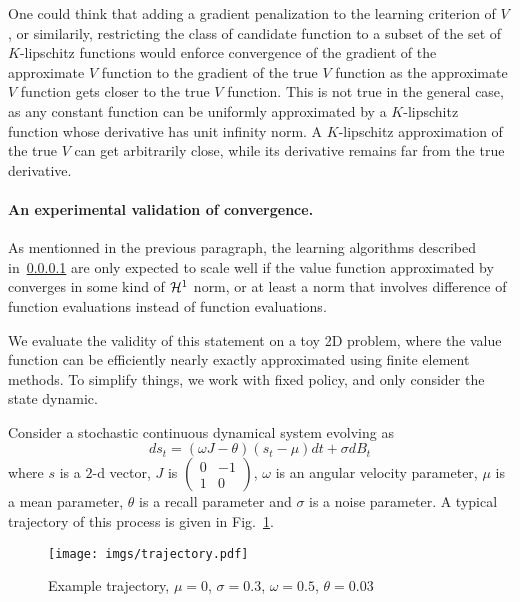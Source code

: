 One could think that adding a gradient penalization to the learning criterion of
$V$, or similarily, restricting the class of candidate function to a subset of 
the set of $K$-lipschitz functions would enforce convergence of the gradient of the
approximate $V$ function to the gradient of the true $V$ function as the approximate
$V$ function gets closer to the true $V$ function. This is not true
in the general case, as any constant function can be uniformly approximated by a
$K$-lipschitz function whose derivative has unit infinity norm. A $K$-lipschitz
approximation of the true $V$ can get arbitrarily close, while its derivative remains
far from the true derivative.

\paragraph{An experimental validation of \tdz convergence.}
As mentionned in the previous paragraph, the learning algorithms described
in~\ref{} are only expected to scale well if the value function approximated by
\tdz converges in some kind of $\mathcal{H}^1$ norm, or at least a norm that involves
difference of function evaluations instead of function evaluations.

We evaluate the validity of this statement on a toy 2D problem, where the
value function can be efficiently nearly exactly approximated using finite
element methods. To simplify things, we work with fixed policy, and only
consider the state dynamic.

Consider a stochastic continuous dynamical system evolving as
\begin{equation}
	ds_t = (\omega J -\theta) (s_t - \mu) dt + \sigma dB_t
\end{equation}
where $s$ is a $2$-d vector, $J$ is $\begin{pmatrix} 0 & -1 \\ 1 & 0\end{pmatrix}$,
$\omega$ is an angular velocity parameter, $\mu$ is a mean parameter, $\theta$ is a
recall parameter and $\sigma$ is a noise parameter. A typical trajectory of this process
is given in Fig.~\ref{fig:trajectory}.
\begin{figure}
	\texttt{[image: imgs/trajectory.pdf]}
	\caption{Example trajectory, $\mu=0$, $\sigma=0.3$, $\omega=0.5$,
	$\theta=0.03$}
	\label{fig:trajectory}
\end{figure}

